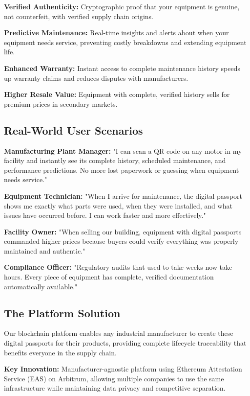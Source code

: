 \documentclass[11pt,a4paper]{article}
\begin{document}
\textbf{Verified Authenticity:} Cryptographic proof that your equipment is genuine, not counterfeit, with verified supply chain origins.

\textbf{Predictive Maintenance:} Real-time insights and alerts about when your equipment needs service, preventing costly breakdowns and extending equipment life.

\textbf{Enhanced Warranty:} Instant access to complete maintenance history speeds up warranty claims and reduces disputes with manufacturers.

\textbf{Higher Resale Value:} Equipment with complete, verified history sells for premium prices in secondary markets.

\subsection{Real-World User Scenarios}

\textbf{Manufacturing Plant Manager:}
"I can scan a QR code on any motor in my facility and instantly see its complete history, scheduled maintenance, and performance predictions. No more lost paperwork or guessing when equipment needs service."

\textbf{Equipment Technician:}
"When I arrive for maintenance, the digital passport shows me exactly what parts were used, when they were installed, and what issues have occurred before. I can work faster and more effectively."

\textbf{Facility Owner:}
"When selling our building, equipment with digital passports commanded higher prices because buyers could verify everything was properly maintained and authentic."

\textbf{Compliance Officer:}
"Regulatory audits that used to take weeks now take hours. Every piece of equipment has complete, verified documentation automatically available."

\subsection{The Platform Solution}

Our blockchain platform enables any industrial manufacturer to create these digital passports for their products, providing complete lifecycle traceability that benefits everyone in the supply chain.

\textbf{Key Innovation:} Manufacturer-agnostic platform using Ethereum Attestation Service (EAS) on Arbitrum, allowing multiple companies to use the same infrastructure while maintaining data privacy and competitive separation.
\end{document}
